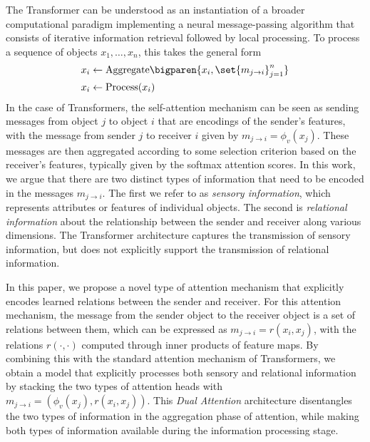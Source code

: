 The Transformer can be understood as an instantiation of a broader computational paradigm implementing a neural message-passing algorithm that consists of iterative information retrieval followed by local processing. To process a sequence of objects $x_1,\ldots, x_n$, this takes the general form
\begin{equation}\label{eq:intro_message_passing}
  \begin{split}
    x_i &\gets \mathrm{Aggregate}\bigparen{x_i, \set{m_{j \to i}}_{j=1}^{n}} \\
    x_i &\gets \mathrm{Process}(x_i)
  \end{split}
\end{equation}
In the case of Transformers, the self-attention mechanism can be seen as sending messages from object $j$ to object $i$ that are encodings of the sender's features, with the message from sender $j$ to receiver $i$ given by $m_{j \to i} = \phi_v(x_j)$. These messages are then aggregated according to some selection criterion based on the receiver's features,  typically given by the softmax attention scores. In this work, we argue that there are two distinct types of information that need to be encoded in the messages $m_{j \to i}$. The first we refer to as \textit{sensory information}, which represents attributes or features of individual objects. The second is \textit{relational information} about the relationship between the sender and receiver along various dimensions.
The Transformer architecture captures the transmission of sensory information, but does not explicitly support the transmission of relational information.

In this paper, we propose a novel type of attention mechanism that explicitly encodes learned relations between the sender and receiver. For this attention mechanism, the message from the sender object to the receiver object is a set of relations between them, which can be expressed as $m_{j \to i} = r(x_i, x_j)$, with the relations $r(\cdot,\cdot)$ computed through inner products of feature maps. By combining this with the standard attention mechanism of Transformers, we obtain a model that explicitly processes both sensory and relational information by stacking the two types of attention heads with $m_{j \to i} = (\phi_v(x_j), r(x_i, x_j))$. This \textit{Dual Attention} architecture disentangles the two types of information in the aggregation phase of attention, while making both types of information available during the information processing stage.

